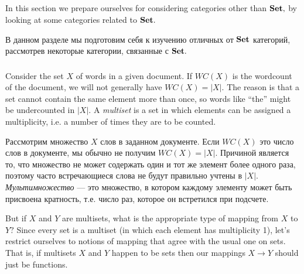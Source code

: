 \documentclass[../main/CT4S-EN-RU]{subfiles}
\begin{document}

\subsection{}

\begin{blockENG}
In this section we prepare ourselves for considering categories other than ${\mathbf{Set}},$ by looking at some categories related to ${\mathbf{Set}}.$ 
\end{blockENG}

\begin{blockRUS}
В данном разделе мы подготовим себя к изучению отличных от ${\mathbf{Set}}$ категорий, рассмотрев некоторые категории, связанные с ${\mathbf{Set}}.$ 
\end{blockRUS}


\subsubsection{}

\begin{blockENG}
Consider the set $X$ of words in a given document. If $WC(X)$ is the wordcount of the document, we will not generally have $WC(X)=|X|.$ The reason is that a set cannot contain the same element more than once, so words like “the” might be undercounted in $|X|.$ A {\em multiset} is a set in which elements can be assigned a multiplicity, i.e. a number of times they are to be counted. 
\end{blockENG}

\begin{blockRUS}
Рассмотрим множество $X$ слов в заданном документе. Если $WC(X)$ это число слов в документе, мы обычно не получим $WC(X)=|X|.$ Причиной является то, что множество не может содержать один и тот же элемент более одного раза, поэтому часто встречающиеся слова не будут правильно учтены в $|X|.$ {\em Мультимножество} — это множество, в котором каждому элементу может быть присвоена кратность, т.е. число раз, которое он встретился при подсчете. 
\end{blockRUS}

\begin{blockENG}
But if $X$ and $Y$ are multisets, what is the appropriate type of mapping from $X$ to $Y?$ Since every set is a multiset (in which each element has multiplicity 1), let's restrict ourselves to notions of mapping that agree with the usual one on sets. That is, if multisets $X$ and $Y$ happen to be sets then our mappings $X{→} Y$ should just be functions.
\end{blockENG}
\end{document}
